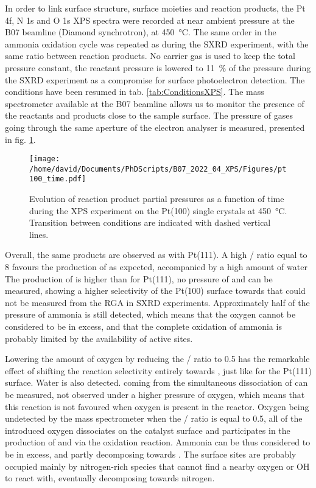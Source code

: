 In order to link surface structure, surface moieties and reaction products, the Pt 4f, N 1s and O 1s XPS spectra were recorded at near ambient pressure at the B07 beamline (Diamond synchrotron), at \qty{450}{\degreeCelsius}.
The same order in the ammonia oxidation cycle was repeated as during the SXRD experiment, with the same ratio between reaction products.
No carrier gas is used to keep the total pressure constant, the reactant pressure is lowered to \qty{11}{\percent} of the pressure during the SXRD experiment as a compromise for surface photoelectron detection.
The conditions have been resumed in tab. \ref{tab:ConditionsXPS}.
The mass spectrometer available at the B07 beamline allows us to monitor the presence of the reactants and products close to the sample surface.
The pressure of gases going through the same aperture of the electron analyser is measured, presented in fig. \ref{fig:XPS100RGA}.

\begin{figure}[!htb]
    \centering
    \texttt{[image: /home/david/Documents/PhDScripts/B07\_2022\_04\_XPS/Figures/pt100\_time.pdf]}
    \caption{
        Evolution of reaction product partial pressures as a function of time during the XPS experiment on the Pt(100) single crystals at \qty{450}{\degreeCelsius}.
        Transition between conditions are indicated with dashed vertical lines.
    }
    \label{fig:XPS100RGA}
\end{figure}

Overall, the same products are observed as with Pt(111).
A high / ratio equal to \num{8} favours the production of  as expected, accompanied by a high amount of water
The production of  is higher than for Pt(111), no pressure of  and  can be measured, showing a higher selectivity of the Pt(100) surface towards  that could not be measured from the RGA in SXRD experiments.
Approximately half of the pressure of ammonia is still detected, which means that the oxygen cannot be considered to be in excess, and that the complete oxidation of ammonia is probably limited by the availability of active sites.

Lowering the amount of oxygen by reducing the / ratio to \num{0.5} has the remarkable effect of shifting the reaction selectivity entirely towards , just like for the Pt(111) surface.
Water is also detected.
 coming from the simultaneous dissociation of  can be measured, not observed under a higher pressure of oxygen, which means that this reaction is not favoured when oxygen is present in the reactor.
Oxygen being undetected by the mass spectrometer when the / ratio is equal to \num{0.5}, all of the introduced oxygen dissociates on the catalyst surface and participates in the production of  and  via the oxidation reaction.
Ammonia can be thus considered to be in excess, and partly decomposing towards .
The surface sites are probably occupied mainly by nitrogen-rich species that cannot find a nearby oxygen or OH to react with, eventually decomposing towards nitrogen.

